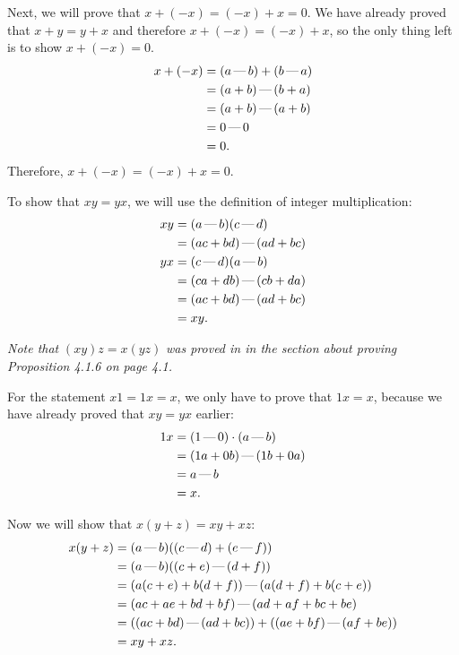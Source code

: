 \documentclass[12pt, oneside]{book}
\newcommand{\formalminus}{\, \text{\textemdash} \,}
\begin{document}
	Next, we will prove that $x + (-x) = (-x) + x = 0$. We have already proved that $x + y = y + x$ and therefore $x + (-x) = (-x) + x$, so the only thing left is to show $x + (-x) = 0$.
	\[\begin{split}
		x + (-x) &= (a \formalminus b) + (b \formalminus a) \\
		&= (a + b) \formalminus (b + a) \\
		&= (a + b) \formalminus (a + b) \\
		&= 0 \formalminus 0 \\
		&= 0.
	\end{split}\]
	Therefore, $x + (-x) = (-x) + x = 0$.

	To show that $xy = yx$, we will use the definition of integer multiplication:
	\begin{align*}
		xy &= (a \formalminus b)(c \formalminus d) \\
		&= (ac + bd) \formalminus (ad + bc) \\
		yx &= (c \formalminus d)(a \formalminus b) \\
		&= (ca + db) \formalminus (cb + da) \\
		&= (ac + bd) \formalminus (ad + bc) \\
		&= xy.
	\end{align*}

	\emph{Note that} $(xy)z = x(yz)$ \emph{was proved in in the section about proving Proposition 4.1.6 on page 4.1.}

	For the statement $x1 = 1x = x$, we only have to prove that $1x = x$, because we have already proved that $xy = yx$ earlier:
	\[\begin{split}
		1x &= (1 \formalminus 0) \cdot (a \formalminus b) \\
		&= (1a + 0b) \formalminus (1b + 0a) \\
		&= a \formalminus b \\
		&= x.
	\end{split}\]

	Now we will show that $x(y + z) = xy + xz$:
	\[\begin{split}
		x(y + z) &= (a \formalminus b)((c \formalminus d) + (e \formalminus f)) \\
		&= (a \formalminus b)((c + e) \formalminus (d + f)) \\
		&= (a(c + e) + b(d + f)) \formalminus (a(d + f) + b(c + e)) \\
		&= (ac + ae + bd + bf) \formalminus (ad + af + bc + be) \\
		&= ((ac + bd) \formalminus (ad + bc)) + ((ae + bf) \formalminus (af + be)) \\
		&= xy + xz.
	\end{split}\]
\end{document}

